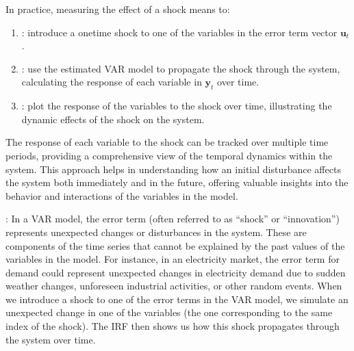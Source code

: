 \documentclass[letterpaper,10pt,english]{jupyterBook}
\begin{document}
\sphinxAtStartPar
In practice, measuring the effect of a shock means to:
\begin{enumerate}
%
\item {} 
\sphinxAtStartPar
{}: introduce a one\sphinxhyphen{}time shock to one of the variables in the error term vector \(\mathbf{u}_t\).

\item {} 
\sphinxAtStartPar
{}: use the estimated VAR model to propagate the shock through the system, calculating the response of each variable in \(\mathbf{y}_t\) over time.

\item {} 
\sphinxAtStartPar
{}: plot the response of the variables to the shock over time, illustrating the dynamic effects of the shock on the system.

\end{enumerate}

\sphinxAtStartPar
The response of each variable to the shock can be tracked over multiple time periods, providing a comprehensive view of the temporal dynamics within the system. This approach helps in understanding how an initial disturbance affects the system both immediately and in the future, offering valuable insights into the behavior and interactions of the variables in the model.

\sphinxAtStartPar
{}:
In a VAR model, the error term (often referred to as “shock” or “innovation”) represents unexpected changes or disturbances in the system. These are components of the time series that cannot be explained by the past values of the variables in the model. For instance, in an electricity market, the error term for demand could represent unexpected changes in electricity demand due to sudden weather changes, unforeseen industrial activities, or other random events. When we introduce a shock to one of the error terms in the VAR model, we simulate an unexpected change in one of the variables (the one corresponding to the same index of the shock). The IRF then shows us how this shock propagates through the system over time.
\end{document}
